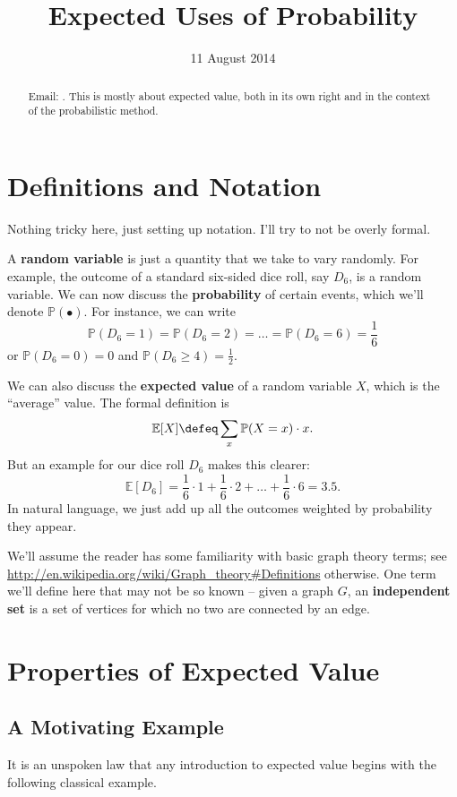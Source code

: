 \documentclass[11pt]{scrartcl}
\newcommand\EE{\mathbb E}
\newcommand\PP{\mathbb P}
\begin{document}
\title{Expected Uses of Probability}
\date{11 August 2014}
\maketitle
{}

\begin{abstract}
  Email: .
  This is mostly about expected value, both in its own right
  and in the context of the probabilistic method.
\end{abstract}


\section{Definitions and Notation}
Nothing tricky here, just setting up notation.
I'll try to not be overly formal.

A \textbf{random variable} is just a quantity that we take to vary randomly.
For example, the outcome of a standard six-sided dice roll, say $D_6$,
is a random variable.
We can now discuss the \textbf{probability} of certain events, which we'll denote $\PP(\bullet)$.
For instance, we can write
\[ \PP(D_6=1) = \PP(D_6=2) = \dots = \PP(D_6=6) = \frac 16 \]
or $\PP(D_6=0) = 0$ and $\PP (D_6 \ge 4) = \frac 12$.

We can also discuss the \textbf{expected value} of a random variable $X$, which
is the ``average'' value. The formal definition is
\[ \EE[X] \defeq \sum_x \PP(X = x) \cdot x. \]
But an example for our dice roll $D_6$ makes this clearer:
\[ \EE[D_6] = \frac 16 \cdot 1 + \frac 16 \cdot 2 + \dots + \frac 16 \cdot 6 = 3.5. \]
In natural language, we just add up all the outcomes
weighted by probability they appear.

We'll assume the reader has some familiarity with basic graph theory terms;
see \url{http://en.wikipedia.org/wiki/Graph_theory#Definitions} otherwise.
One term we'll define here that may not be so known -- given a graph $G$,
an \textbf{independent set} is a set of vertices for which no two are connected
by an edge.

\section{Properties of Expected Value}
\subsection{A Motivating Example}
It is an unspoken law that any introduction to expected value
begins with the following classical example.
\end{document}
